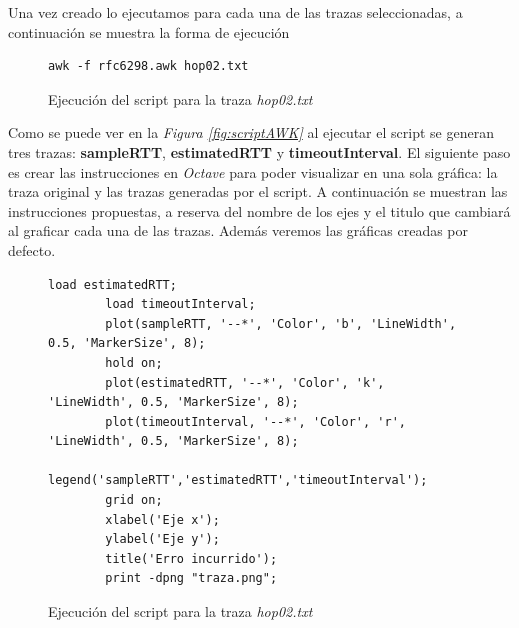 \noindent Una vez creado lo ejecutamos para cada una de las trazas seleccionadas, a continuaci\'on se muestra la forma de
ejecuci\'on 

\begin{figure}[H]
    \centering
    \begin{lstlisting}[frame=single, breaklines=true, basicstyle=\footnotesize\ttfamily, breakatwhitespace=false, 
        columns=flexible, tabsize=2, showstringspaces=fals] 
        awk -f rfc6298.awk hop02.txt
    \end{lstlisting}
    \caption{Ejecuci\'on del script para la traza \textit{hop02.txt}}
    \label{fig:execScript}
\end{figure}

\noindent Como se puede ver en la \textit{Figura \ref*{fig:scriptAWK}} al ejecutar el script se generan tres trazas: 
\textbf{sampleRTT}, \textbf{estimatedRTT} y \textbf{timeoutInterval}. El siguiente paso es crear las instrucciones en 
\textit{Octave} para poder visualizar en una sola gr\'afica: la traza original y las trazas generadas por el script. 
A continuaci\'on se muestran las instrucciones propuestas, a reserva del nombre de los ejes y el titulo que cambiar\'a
al graficar cada una de las trazas. Adem\'as veremos las gr\'aficas creadas por defecto.

\begin{figure}[H]
    \centering
    \begin{lstlisting}[frame=single, breaklines=true, basicstyle=\footnotesize\ttfamily, breakatwhitespace=false, 
        columns=flexible, tabsize=2, showstringspaces=fals] 
        load estimatedRTT;
        load timeoutInterval;
        plot(sampleRTT, '--*', 'Color', 'b', 'LineWidth', 0.5, 'MarkerSize', 8);
        hold on;
        plot(estimatedRTT, '--*', 'Color', 'k', 'LineWidth', 0.5, 'MarkerSize', 8);
        plot(timeoutInterval, '--*', 'Color', 'r', 'LineWidth', 0.5, 'MarkerSize', 8);
        legend('sampleRTT','estimatedRTT','timeoutInterval');
        grid on;
        xlabel('Eje x');
        ylabel('Eje y');
        title('Erro incurrido');
        print -dpng "traza.png";
    \end{lstlisting}
    \caption{Ejecuci\'on del script para la traza \textit{hop02.txt}}
    \label{fig:execScript}
\end{figure}

\newpage


